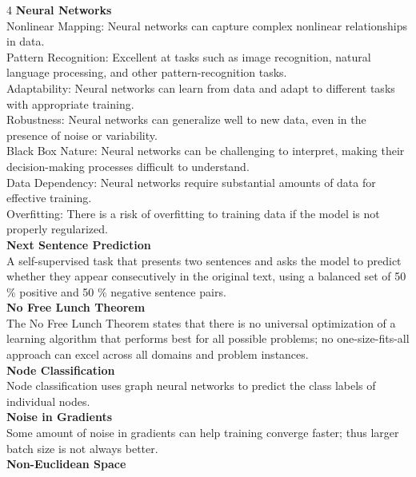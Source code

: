\documentclass[8pt]{extarticle}
\begin{document}
\begin{multicols}{4}
\vspace{2pt}\textbf{Neural Networks}\\
Nonlinear Mapping: Neural networks can capture complex nonlinear relationships in data.\\
Pattern Recognition: Excellent at tasks such as image recognition, natural language processing, and other pattern-recognition tasks.\\
Adaptability: Neural networks can learn from data and adapt to different tasks with appropriate training.\\
Robustness: Neural networks can generalize well to new data, even in the presence of noise or variability.\\
Black Box Nature: Neural networks can be challenging to interpret, making their decision-making processes difficult to understand.\\
Data Dependency: Neural networks require substantial amounts of data for effective training.\\
Overfitting: There is a risk of overfitting to training data if the model is not properly regularized.\\
\vspace{2pt}\textbf{Next Sentence Prediction}\\
A self-supervised task that presents two sentences and asks the model to predict whether they appear consecutively in the original text, using a balanced set of 50 \% positive and 50 \% negative sentence pairs.\\
\vspace{2pt}\textbf{No Free Lunch Theorem}\\
The No Free Lunch Theorem states that there is no universal optimization of a learning algorithm that performs best for all possible problems; no one-size-fits-all approach can excel across all domains and problem instances.\\
\vspace{2pt}\textbf{Node Classification}\\
Node classification uses graph neural networks to predict the class labels of individual nodes.\\
\vspace{2pt}\textbf{Noise in Gradients}\\
Some amount of noise in gradients can help training converge faster; thus larger batch size is not always better.\\
\vspace{2pt}\textbf{Non-Euclidean Space}\\

\end{multicols}
\end{document}
